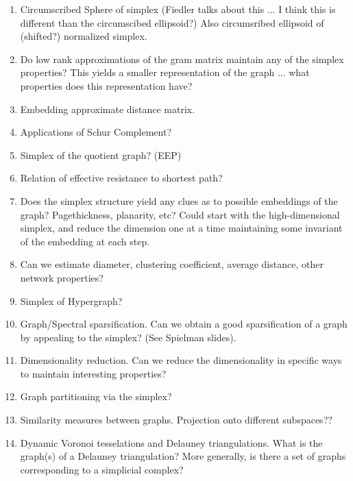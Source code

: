 \begin{enumerate}
\item Circumscribed Sphere of simplex (Fiedler talks about this ... I think this is different than the circumscibed ellipsoid?) Also circumsribed ellipsoid of (shifted?) normalized simplex. 
\item Do low rank approximations of the gram matrix maintain any of the simplex properties? This yields a smaller representation of the graph ... what properties does this representation have?
\item Embedding approximate distance matrix. 
\item Applications of Schur Complement? 
    \item Simplex of the quotient graph? (EEP)
    \item Relation of effective resistance to shortest path?
    \item Does the simplex structure yield any clues as to possible embeddings of the graph? Pagethickness, planarity, etc? Could start with the high-dimensional simplex, and reduce the dimension one at a time maintaining some invariant of the embedding at each step. 
    \item Can we estimate diameter, clustering coefficient, average distance, other network properties?
    \item Simplex of Hypergraph? 
    \item Graph/Spectral sparsification. Can we obtain a good sparsification of a graph by appealing to the simplex? (See Spielman slides). 
    \item Dimensionality reduction. Can we reduce the dimensionality in specific ways to maintain interesting properties? 
    \item Graph partitioning via the simplex? 
    \item Similarity measures between graphs. Projection onto different subspaces??
    \item Dynamic Voronoi tesselations and Delauney triangulations. What is the graph(s) of a Delauney triangulation? More generally, is there a set of graphs corresponding to a simplicial complex? 


\end{enumerate}

